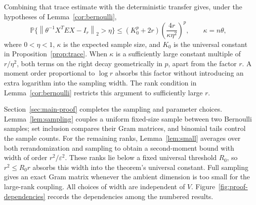 \documentclass[11pt]{article}
\theoremstyle{definition}
\theoremstyle{remark}
\theoremstyle{plain}
\newcommand{\Prob}{\mathbb P}
\newcommand{\norm}[1]{\left\lVert#1\right\rVert_2}
\begin{document}
Combining that trace estimate with the deterministic transfer gives,
under the hypotheses of Lemma~\ref{cor:bernoulli},
\[
 \Prob\{\norm{\theta^{-1}X^TEX-I_r}>\eta\}
 \le (K_0^p+2r)\left(\frac{4r}{\kappa\eta^2}\right)^p,
 \qquad \kappa=n\theta,
\]
where $0<\eta<1$, $\kappa$ is the expected sample size, and $K_0$
is the universal constant in Proposition~\ref{prop:trace}.
When $\kappa$ is a sufficiently large constant multiple of
$r/\eta^2$, both terms on the right decay geometrically in $p$,
apart from the factor $r$. A moment order proportional to $\log r$
absorbs this factor without introducing an extra logarithm into
the sampling width. The rank condition in
Lemma~\ref{cor:bernoulli} restricts this argument to sufficiently
large $r$.

Section~\ref{sec:main-proof} completes the sampling and parameter
choices. Lemma~\ref{lem:sampling} couples a uniform fixed-size sample
between two Bernoulli samples; set inclusion compares their Gram
matrices, and binomial tails control the sample counts.
For the remaining ranks, Lemma~\ref{lem:small} averages over both
rerandomization and sampling to obtain a second-moment bound with
width of order $r^2/\varepsilon^2$. These ranks lie below a fixed
universal threshold $R_0$, so $r^2\le R_0r$ absorbs this width into
the theorem's universal constant. Full sampling gives an exact
Gram matrix whenever the ambient dimension is too small for the
large-rank coupling. All choices of width are independent of $V$.
Figure~\ref{fig:proof-dependencies} records the dependencies among
the numbered results.
\end{document}
